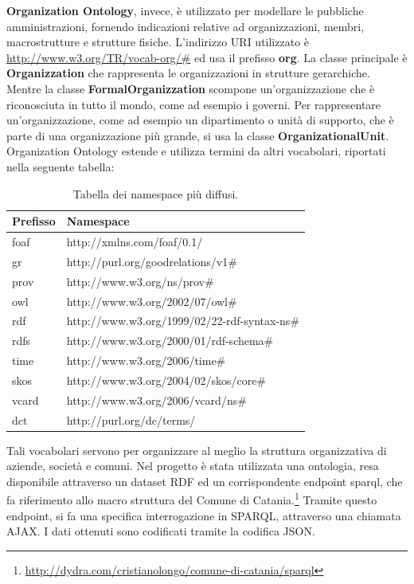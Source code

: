 \documentclass[a4paper,11pt]{article}
\begin{document}
\textbf{Organization Ontology}, invece, è utilizzato per modellare le pubbliche amministrazioni, fornendo indicazioni relative ad organizzazioni, membri, macrostrutture e strutture fisiche.
L'indirizzo URI utilizzato è \url{http://www.w3.org/TR/vocab-org/\#} ed usa il prefisso \textbf{org}.\newline
La classe principale è \textbf{Organizzation} che rappresenta le organizzazioni in strutture gerarchiche.
Mentre la classe \textbf{FormalOrganizzation} scompone un'organizzazione che è riconosciuta in tutto il mondo, come ad esempio i governi.
Per rappresentare un'organizzazione, come ad esempio un dipartimento o unità di supporto, che è parte di una organizzazione più grande, si usa la classe \textbf{OrganizationalUnit}.
Organization Ontology estende e utilizza termini da altri vocabolari, riportati nella seguente tabella:
\begin{table}[!htb]
\begin{center}				
\begin{tabular}{|>{\small}l|>{\small}l|}
	\hline \textbf{Prefisso} & \textbf{Namespace}\\				
	\hline foaf & http://xmlns.com/foaf/0.1/\\
	\hline gr & http://purl.org/goodrelations/v1\#\\
	\hline prov & http://www.w3.org/ns/prov\#\\
	\hline owl & http://www.w3.org/2002/07/owl\#\\
	\hline rdf & http://www.w3.org/1999/02/22-rdf-syntax-ns\#\\
	\hline rdfs & http://www.w3.org/2000/01/rdf-schema\#\\			
	\hline time & http://www.w3.org/2006/time\#\\
	\hline skos & http://www.w3.org/2004/02/skos/core\#\\					
	\hline vcard & http://www.w3.org/2006/vcard/ns\#\\											\hline 	dct & http://purl.org/dc/terms/\\			
	\hline
\end{tabular}	
\caption{Tabella dei namespace più diffusi.}	
\end{center}	
\end{table}\newpage
Tali vocabolari servono per organizzare al meglio la struttura organizzativa di aziende, società e comuni.
Nel progetto è stata utilizzata una ontologia, resa disponibile attraverso un dataset RDF ed un corrispondente endpoint sparql, che fa riferimento allo macro struttura del Comune di Catania.\footnote{\url{http://dydra.com/cristianolongo/comune-di-catania/sparql}}\newline
Tramite questo endpoint, si fa una specifica interrogazione in SPARQL, attraverso una chiamata AJAX. I dati ottenuti sono codificati tramite la codifica JSON.
\newpage
\end{document}

